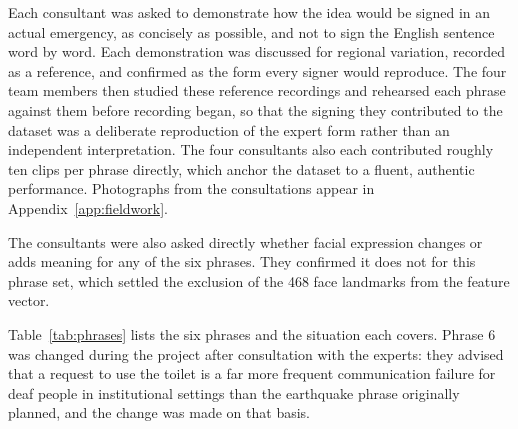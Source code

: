 Each consultant was asked to demonstrate how the idea would be signed in an actual emergency, as concisely as possible, and not to sign the English sentence word by word. Each demonstration was discussed for regional variation, recorded as a reference, and confirmed as the form every signer would reproduce. The four team members then studied these reference recordings and rehearsed each phrase against them before recording began, so that the signing they contributed to the dataset was a deliberate reproduction of the expert form rather than an independent interpretation. The four consultants also each contributed roughly ten clips per phrase directly, which anchor the dataset to a fluent, authentic performance. Photographs from the consultations appear in Appendix~\ref{app:fieldwork}.

The consultants were also asked directly whether facial expression changes or adds meaning for any of the six phrases. They confirmed it does not for this phrase set, which settled the exclusion of the 468 face landmarks from the feature vector.

Table~\ref{tab:phrases} lists the six phrases and the situation each covers. Phrase 6 was changed during the project after consultation with the experts: they advised that a request to use the toilet is a far more frequent communication failure for deaf people in institutional settings than the earthquake phrase originally planned, and the change was made on that basis.

